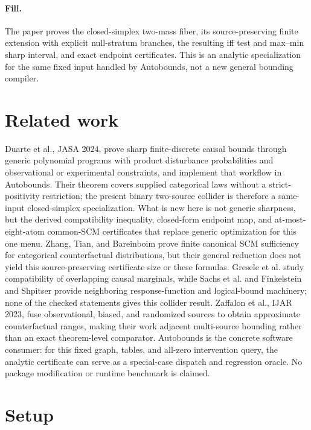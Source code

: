 \documentclass{article}
\begin{document}
\paragraph{Fill.} The paper proves the closed-simplex two-mass fiber, its source-preserving finite extension with explicit null-stratum branches, the resulting iff test and max--min sharp interval, and exact endpoint certificates.  This is an analytic specialization for the same fixed input handled by Autobounds, not a new general bounding compiler.

\section{Related work}

Duarte et al., JASA 2024, prove sharp finite-discrete causal bounds through generic polynomial programs with product disturbance probabilities and observational or experimental constraints, and implement that workflow in Autobounds.  Their theorem covers supplied categorical laws without a strict-positivity restriction; the present binary two-source collider is therefore a same-input closed-simplex specialization.  What is new here is not generic sharpness, but the derived compatibility inequality, closed-form endpoint map, and at-most-eight-atom common-SCM certificates that replace generic optimization for this one menu.  Zhang, Tian, and Bareinboim prove finite canonical SCM sufficiency for categorical counterfactual distributions, but their general reduction does not yield this source-preserving certificate size or these formulas.  Gresele et al. study compatibility of overlapping causal marginals, while Sachs et al. and Finkelstein and Shpitser provide neighboring response-function and logical-bound machinery; none of the checked statements gives this collider result.  Zaffalon et al., IJAR 2023, fuse observational, biased, and randomized sources to obtain approximate counterfactual ranges, making their work adjacent multi-source bounding rather than an exact theorem-level comparator.  Autobounds is the concrete software consumer: for this fixed graph, tables, and all-zero intervention query, the analytic certificate can serve as a special-case dispatch and regression oracle.  No package modification or runtime benchmark is claimed.

\section{Setup}
\end{document}
